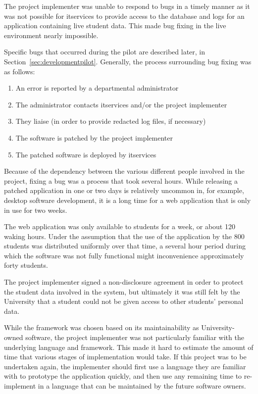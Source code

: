 \mynobreakpar

The project implementer was unable to respond to bugs in a timely manner as it
was not possible for \gls{itservices} to provide access to the database and
logs for an application containing live student data. This made bug fixing in
the live environment nearly impossible.

Specific bugs that occurred during the pilot are described later, in
Section~\ref{sec:developmentpilot}. Generally, the process surrounding bug fixing
was as follows:

\begin{enumerate}
  \item An error is reported by a departmental administrator
  \item The administrator contacts \gls{itservices} and/or the project implementer
  \item They liaise (in order to provide redacted log files, if necessary)
  \item The software is patched by the project implementer
  \item The patched software is deployed by \gls{itservices}
\end{enumerate}

Because of the dependency between the various different people involved in the
project, fixing a bug was a process that took several hours. While releasing a
patched application in one or two days is relatively uncommon in, for example,
desktop software development, it is a long time for a web application that is
only in use for two weeks.

The web application was only available to students for a week, or about 120
waking hours. Under the assumption that the use of the application by the 800
students was distributed uniformly over that time, a several hour period during
which the software was not fully functional might inconvenience approximately
forty students.

The project implementer signed a non-disclosure agreement in order to protect
the student data involved in the system, but ultimately it was still felt by
the University that a student could not be given access to other students'
personal data.

\mynobreakpar

While the framework was chosen based on its maintainability as
University-owned software, the project implementer was not particularly
familiar with the underlying language and framework. This made it hard to
estimate the amount of time that various stages of implementation would take.
If this project was to be undertaken again, the implementer should first use a
language they are familiar with to prototype the application quickly, and then
use any remaining time to re-implement in a language that can be maintained by
the future software owners.

